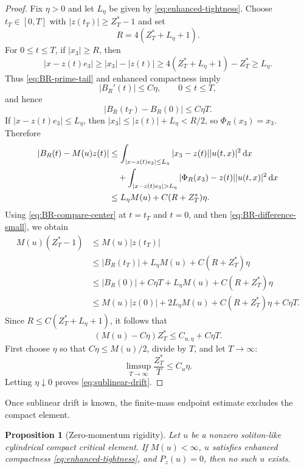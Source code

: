 \documentclass[preprint,12pt]{elsarticle}
\numberwithin{equation}{section}
\newcommand{\dd}{\,\mathrm d}
\newcommand{\ez}{e_3}
\newtheorem{proposition}[theorem]{Proposition}
\theoremstyle{remark}
\begin{document}
\begin{proof}
Fix $\eta>0$ and let $L_\eta$ be given by \eqref{eq:enhanced-tightness}.  Choose $t_T\in[0,T]$ with $|z(t_T)|\ge Z_T^*-1$ and set
\begin{equation}\label{eq:R-center-mass}
  R=4(Z_T^*+L_\eta+1).
\end{equation}
For $0\le t\le T$, if $|x_3|\ge R$, then
\[
  |x-z(t)\ez|\ge |x_3|-|z(t)|\ge 4(Z_T^*+L_\eta+1)-Z_T^*\ge L_\eta.
\]
Thus \eqref{eq:BR-prime-tail} and enhanced compactness imply
\[
  |B_R'(t)|\le C\eta,
  \qquad 0\le t\le T,
\]
and hence
\begin{equation}\label{eq:BR-difference-small}
  |B_R(t_T)-B_R(0)|\le C\eta T.
\end{equation}
If $|x-z(t)\ez|\le L_\eta$, then $|x_3|\le |z(t)|+L_\eta<R/2$, so $\Phi_R(x_3)=x_3$.  Therefore
\begin{align}
  |B_R(t)-M(u)z(t)|
  &\le \int_{|x-z(t)\ez|\le L_\eta}|x_3-z(t)||u(t,x)|^2\dd x \notag\\
  &\quad +\int_{|x-z(t)\ez|>L_\eta}|\Phi_R(x_3)-z(t)||u(t,x)|^2\dd x \notag\\
  &\le L_\eta M(u)+C(R+Z_T^*)\eta.\label{eq:BR-compare-center}
\end{align}
Using \eqref{eq:BR-compare-center} at $t=t_T$ and $t=0$, and then \eqref{eq:BR-difference-small}, we obtain
\begin{align*}
  M(u)(Z_T^*-1)
  &\le M(u)|z(t_T)| \\
  &\le |B_R(t_T)|+L_\eta M(u)+C(R+Z_T^*)\eta \\
  &\le |B_R(0)|+C\eta T+L_\eta M(u)+C(R+Z_T^*)\eta \\
  &\le M(u)|z(0)|+2L_\eta M(u)+C(R+Z_T^*)\eta+C\eta T.
\end{align*}
Since $R\le C(Z_T^*+L_\eta+1)$, it follows that
\[
  (M(u)-C\eta)Z_T^*\le C_{u,\eta}+C\eta T.
\]
First choose $\eta$ so that $C\eta\le M(u)/2$, divide by $T$, and let $T\to\infty$:
\[
  \limsup_{T\to\infty}\frac{Z_T^*}{T}\le C_u\eta.
\]
Letting $\eta\downarrow0$ proves \eqref{eq:sublinear-drift}.
\end{proof}

Once sublinear drift is known, the finite-mass endpoint estimate excludes the compact element.

\begin{proposition}[Zero-momentum rigidity]\label{prop:finite-mass-zero-momentum}
Let $u$ be a nonzero soliton-like cylindrical compact critical element.  If $M(u)<\infty$, $u$ satisfies enhanced compactness \eqref{eq:enhanced-tightness}, and $P_z(u)=0$, then no such $u$ exists.
\end{proposition}
\end{document}
